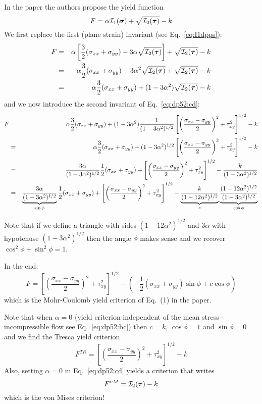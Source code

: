 In the paper the authors propose the yield function 
\[
F = \alpha {\cal I}_1(\bm\sigma) + \sqrt{{\cal I}_2(\bm\tau)} - k
\]
We first replace the first (plane strain) invariant (see Eq.~\eqref{eq:I1dpps}):
\begin{eqnarray}
F 
&=& \alpha \left[ \frac32(\sigma_{xx}+\sigma_{yy})- 3 \alpha \sqrt{{\cal I}_2(\bm\tau)} \right]
+ \sqrt{{\cal I}_2(\bm\tau)} - k \nonumber\\
&=&\alpha \frac32(\sigma_{xx}+\sigma_{yy})- 3 \alpha^2 \sqrt{{\cal I}_2(\bm\tau)}
+ \sqrt{{\cal I}_2(\bm\tau)} - k  \nonumber\\
&=&\alpha \frac32(\sigma_{xx}+\sigma_{yy}) +(1- 3 \alpha^2) \sqrt{{\cal I}_2(\bm\tau)} - k \nonumber
\end{eqnarray}
and we now introduce the second invariant of Eq.~\eqref{eq:dp52:cd}:
\begin{eqnarray}
F &=& 
\alpha \frac32(\sigma_{xx}+\sigma_{yy}) +(1- 3 \alpha^2)
\frac{1}{(1 -3\alpha^2)^{1/2}} \left[\left(\frac{\sigma_{xx}-\sigma_{yy}}{2} \right)^2 
+ \tau_{xy}^2 \right]^{1/2} -  k  \nonumber\\
&=& \alpha \frac32(\sigma_{xx}+\sigma_{yy}) +(1- 3 \alpha^2)^{1/2}
\left[\left(\frac{\sigma_{xx}-\sigma_{yy}}{2} \right)^2 + \tau_{xy}^2 \right]^{1/2} 
- k  \nonumber\\
&=&\frac{3\alpha}{(1- 3 \alpha^2)^{1/2}}
\frac12(\sigma_{xx}+\sigma_{yy}) +
\left[\left(\frac{\sigma_{xx}-\sigma_{yy}}{2} \right)^2 + \tau_{xy}^2 \right]^{1/2} 
- \frac{k}{(1- 3 \alpha^2)^{1/2}} 
\nonumber\\
&=&\underbrace{\frac{3\alpha}{(1- 3 \alpha^2)^{1/2}}}_{\sin\phi}
\frac12(\sigma_{xx}+\sigma_{yy}) +
\left[\left(\frac{\sigma_{xx}-\sigma_{yy}}{2} \right)^2 + \tau_{xy}^2 \right]^{1/2} 
- \underbrace{\frac{k}{(1- 12 \alpha^2)^{1/2}}}_{c}
\underbrace{\frac{(1- 12 \alpha^2)^{1/2}}{(1- 3 \alpha^2)^{1/2}}}_{\cos\phi}
\end{eqnarray}


Note that if we define a triangle with sides $(1- 12 \alpha^2)^{1/2}$ and $3\alpha$
with hypotenuse $(1- 3 \alpha^2)^{1/2}$ then the angle $\phi$ makes sense and
we recover $\cos^2\phi+\sin^2\phi=1$.

In the end:
\[
F = 
\left[\left(\frac{\sigma_{xx}-\sigma_{yy}}{2} \right)^2 + \tau_{xy}^2 \right]^{1/2}
-\left(-\frac12(\sigma_{xx}+\sigma_{yy}) \sin \phi + c \cos \phi \right)
\]
which is the Mohr-Coulomb yield criterion of Eq.~(1) in the paper.


Note that when $\alpha=0$ (yield criterion independent of the mean stress - incompressible flow see Eq.~\eqref{eq:dp52:bc}) then $c=k$, $\cos\phi=1$ and $\sin\phi=0$ and we find 
the Tresca yield criterion
\[
F^{TR}=  \left[\left(\frac{\sigma_{xx}-\sigma_{yy}}{2} \right)^2 + \tau_{xy}^2 \right]^{1/2} - k
\]
Also, setting $\alpha=0$ in Eq.~\eqref{eq:dp52:cd} yields a criterion that writes
\[
F^{vM}={\cal I}_2(\bm\tau) - k
\]
which is the von Mises criterion! 



